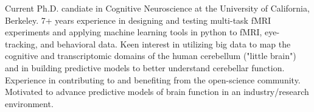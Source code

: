 

\begin{cvparagraph}

Current Ph.D. candiate in Cognitive Neuroscience at the University of California, Berkeley. 7+ years experience in designing and testing multi-task fMRI experiments and applying machine learning tools in python to fMRI, eye-tracking, and behavioral data. Keen interest in utilizing big data to map the cognitive and transcriptomic domains of the human cerebellum ("little brain") and in building predictive models to better understand cerebellar function. Experience in contributing to and benefiting from the open-science community. Motivated to advance predictive models of brain function in an industry/research environment. 

\end{cvparagraph}
